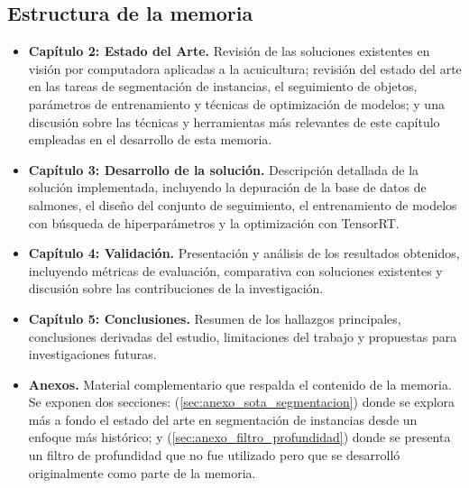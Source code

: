 \subsection{Estructura de la memoria}
\begin{itemize}
    \item \textbf{Capítulo 2: Estado del Arte.} Revisión de las soluciones existentes en visión por computadora aplicadas a la acuicultura; revisión del estado del arte en las tareas de segmentación de instancias, el seguimiento de objetos, parámetros de entrenamiento y técnicas de optimización de modelos; y una discusión sobre las técnicas y herramientas más relevantes de este capítulo empleadas en el desarrollo de esta memoria.
    \item \textbf{Capítulo 3: Desarrollo de la solución.} Descripción detallada de la solución implementada, incluyendo la depuración de la base de datos de salmones, el diseño del conjunto de seguimiento, el entrenamiento de modelos con búsqueda de hiperparámetros y la optimización con TensorRT.
    \item \textbf{Capítulo 4: Validación.} Presentación y análisis de los resultados obtenidos, incluyendo métricas de evaluación, comparativa con soluciones existentes y discusión sobre las contribuciones de la investigación.
    \item \textbf{Capítulo 5: Conclusiones.} Resumen de los hallazgos principales, conclusiones derivadas del estudio, limitaciones del trabajo y propuestas para investigaciones futuras.
    \item \textbf{Anexos.} Material complementario que respalda el contenido de la memoria. Se exponen dos secciones: (\ref{sec:anexo_sota_segmentacion}) donde se explora más a fondo el estado del arte en segmentación de instancias desde un enfoque más histórico; y (\ref{sec:anexo_filtro_profundidad}) donde se presenta un filtro de profundidad que no fue utilizado pero que se desarrolló originalmente como parte de la memoria.
\end{itemize}